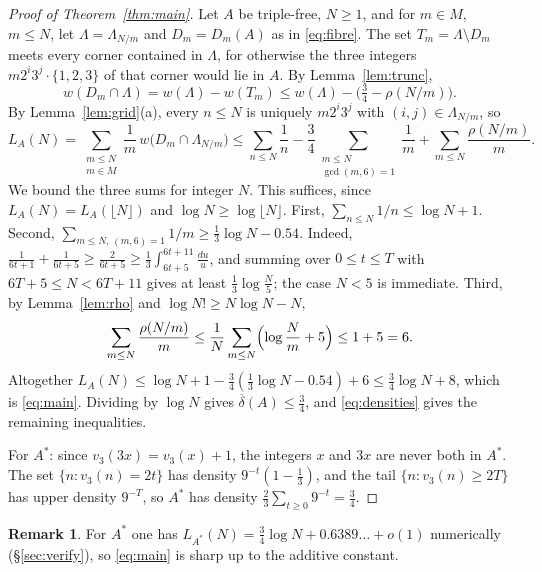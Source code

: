 \documentclass[11pt]{amsart}
\theoremstyle{definition}
\newtheorem{remark}[theorem]{Remark}
\newcommand{\lup}{\overline{\delta}}
\begin{document}
\begin{proof}[Proof of Theorem~\ref{thm:main}]
Let $A$ be triple-free, $N\ge1$, and for $m\in M$, $m\le N$, let $\Lambda=\Lambda_{N/m}$ and $D_m=D_m(A)$ as in \eqref{eq:fibre}. The set $T_m=\Lambda\setminus D_m$ meets every corner contained in $\Lambda$, for otherwise the three integers $m2^i3^j\cdot\{1,2,3\}$ of that corner would lie in $A$. By Lemma~\ref{lem:trunc},
\[
w(D_m\cap\Lambda)=w(\Lambda)-w(T_m)\le w(\Lambda)-\bigl(\tfrac34-\rho(N/m)\bigr).
\]
By Lemma~\ref{lem:grid}(a), every $n\le N$ is uniquely $m2^i3^j$ with $(i,j)\in\Lambda_{N/m}$, so
\[
L_A(N)=\sum_{\substack{m\le N\\ m\in M}}\frac1m\,w\bigl(D_m\cap\Lambda_{N/m}\bigr)\le\sum_{n\le N}\frac1n-\frac34\sum_{\substack{m\le N\\ \gcd(m,6)=1}}\frac1m+\sum_{m\le N}\frac{\rho(N/m)}m .
\]
We bound the three sums for integer $N$. This suffices, since $L_A(N)=L_A(\lfloor N\rfloor)$ and $\log N\ge\log\lfloor N\rfloor$. First, $\sum_{n\le N}1/n\le\log N+1$. Second, $\sum_{m\le N,\,(m,6)=1}1/m\ge\frac13\log N-0.54$. Indeed, $\frac1{6t+1}+\frac1{6t+5}\ge\frac2{6t+5}\ge\frac13\int_{6t+5}^{6t+11}\frac{du}u$, and summing over $0\le t\le T$ with $6T+5\le N<6T+11$ gives at least $\frac13\log\frac{N}{5}$; the case $N<5$ is immediate. Third, by Lemma~\ref{lem:rho} and $\log N!\ge N\log N-N$,
\[
\sum_{m\le N}\frac{\rho(N/m)}m\le\frac1N\sum_{m\le N}\Bigl(\log\frac Nm+5\Bigr)\le1+5=6 .
\]
Altogether $L_A(N)\le\log N+1-\frac34(\frac13\log N-0.54)+6\le\frac34\log N+8$, which is \eqref{eq:main}. Dividing by $\log N$ gives $\lup(A)\le\frac34$, and \eqref{eq:densities} gives the remaining inequalities.

For $A^\ast$: since $v_3(3x)=v_3(x)+1$, the integers $x$ and $3x$ are never both in $A^\ast$. The set $\{n: v_3(n)=2t\}$ has density $9^{-t}(1-\frac13)$, and the tail $\{n:v_3(n)\ge 2T\}$ has upper density $9^{-T}$, so $A^\ast$ has density $\frac23\sum_{t\ge0}9^{-t}=\frac34$.
\end{proof}

\begin{remark}
For $A^\ast$ one has $L_{A^\ast}(N)=\frac34\log N+0.6389\ldots+o(1)$ numerically (\S\ref{sec:verify}), so \eqref{eq:main} is sharp up to the additive constant.
\end{remark}
\end{document}
